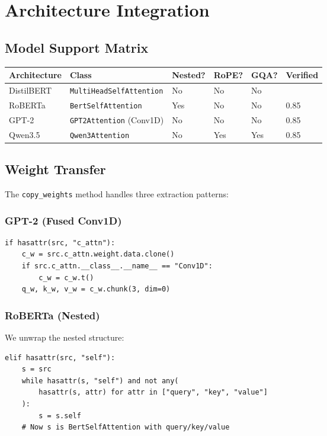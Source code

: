 
\section{Architecture Integration}

\subsection{Model Support Matrix}

\begin{table}[H]
\centering
\small
\begin{tabular}{llllll}
\toprule
\textbf{Architecture} & \textbf{Class} & \textbf{Nested?} & \textbf{RoPE?} & \textbf{GQA?} & \textbf{Verified} \\
\midrule
DistilBERT & \texttt{MultiHeadSelfAttention} & No & No & No &  \\
RoBERTa & \texttt{BertSelfAttention} & Yes & No & No & 0.85 \\
GPT-2 & \texttt{GPT2Attention} (Conv1D) & No & No & No & 0.85 \\
Qwen3.5 & \texttt{Qwen3Attention} & No & Yes & Yes & 0.85 \\
\bottomrule
\end{tabular}
\end{table}

\subsection{Weight Transfer}

The \texttt{copy\_weights} method handles three extraction patterns:

\subsubsection{GPT-2 (Fused Conv1D)}

\begin{lstlisting}
if hasattr(src, "c_attn"):
    c_w = src.c_attn.weight.data.clone()
    if src.c_attn.__class__.__name__ == "Conv1D":
        c_w = c_w.t()
    q_w, k_w, v_w = c_w.chunk(3, dim=0)
\end{lstlisting}

\subsubsection{RoBERTa (Nested)}

We unwrap the nested structure:

\begin{lstlisting}
elif hasattr(src, "self"):
    s = src
    while hasattr(s, "self") and not any(
        hasattr(s, attr) for attr in ["query", "key", "value"]
    ):
        s = s.self
    # Now s is BertSelfAttention with query/key/value
\end{lstlisting}

